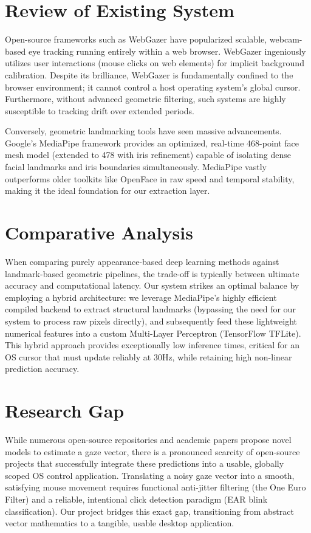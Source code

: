 \documentclass[12pt,a4paper]{report}
\begin{document}
\section{Review of Existing System}
Open-source frameworks such as WebGazer have popularized scalable, webcam-based eye tracking running entirely within a web browser. WebGazer ingeniously utilizes user interactions (mouse clicks on web elements) for implicit background calibration. Despite its brilliance, WebGazer is fundamentally confined to the browser environment; it cannot control a host operating system's global cursor. Furthermore, without advanced geometric filtering, such systems are highly susceptible to tracking drift over extended periods.

Conversely, geometric landmarking tools have seen massive advancements. Google's MediaPipe framework provides an optimized, real-time 468-point face mesh model (extended to 478 with iris refinement) capable of isolating dense facial landmarks and iris boundaries simultaneously. MediaPipe vastly outperforms older toolkits like OpenFace in raw speed and temporal stability, making it the ideal foundation for our extraction layer.

\section{Comparative Analysis}
When comparing purely appearance-based deep learning methods against landmark-based geometric pipelines, the trade-off is typically between ultimate accuracy and computational latency. Our system strikes an optimal balance by employing a hybrid architecture: we leverage MediaPipe's highly efficient compiled backend to extract structural landmarks (bypassing the need for our system to process raw pixels directly), and subsequently feed these lightweight numerical features into a custom Multi-Layer Perceptron (TensorFlow TFLite). This hybrid approach provides exceptionally low inference times, critical for an OS cursor that must update reliably at 30Hz, while retaining high non-linear prediction accuracy.

\section{Research Gap}
While numerous open-source repositories and academic papers propose novel models to estimate a gaze vector, there is a pronounced scarcity of open-source projects that successfully integrate these predictions into a usable, globally scoped OS control application. Translating a noisy gaze vector into a smooth, satisfying mouse movement requires functional anti-jitter filtering (the One Euro Filter) and a reliable, intentional click detection paradigm (EAR blink classification). Our project bridges this exact gap, transitioning from abstract vector mathematics to a tangible, usable desktop application.
\end{document}
